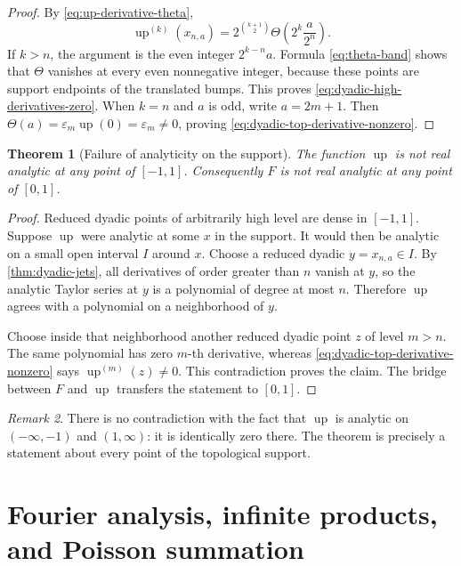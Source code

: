 \documentclass[11pt,oneside]{article}
\newtheorem{theorem}{Theorem}[section]
\theoremstyle{definition}
\theoremstyle{remark}
\newtheorem{remark}[theorem]{Remark}
\newcommand{\upf}{\operatorname{up}}
\newcommand{\epsTM}{\varepsilon}
\newcommand{\Thetaf}{\Theta}
\begin{document}
\begin{proof}
By \eqref{eq:up-derivative-theta},
\[
 \upf^{(k)}(x_{n,a})
 =2^{\binom{k+1}{2}}\Thetaf\left(2^k\frac{a}{2^n}\right).
\]
If $k>n$, the argument is the even integer $2^{k-n}a$.  Formula
\eqref{eq:theta-band} shows that $\Thetaf$ vanishes at every even nonnegative
integer, because these points are support endpoints of the translated bumps.
This proves \eqref{eq:dyadic-high-derivatives-zero}.  When $k=n$ and $a$ is odd,
write $a=2m+1$.  Then
$\Thetaf(a)=\epsTM_m\upf(0)=\epsTM_m\ne0$, proving
\eqref{eq:dyadic-top-derivative-nonzero}.
\end{proof}

\begin{theorem}[Failure of analyticity on the support]\label{thm:nowhere-analytic}
The function $\upf$ is not real analytic at any point of $[-1,1]$.  Consequently
$F$ is not real analytic at any point of $[0,1]$.
\end{theorem}

\begin{proof}
Reduced dyadic points of arbitrarily high level are dense in $[-1,1]$.  Suppose
$\upf$ were analytic at some $x$ in the support.  It would then be analytic on a
small open interval $I$ around $x$.  Choose a reduced dyadic $y=x_{n,a}\in I$.
By \cref{thm:dyadic-jets}, all derivatives of order greater than $n$ vanish at $y$,
so the analytic Taylor series at $y$ is a polynomial of degree at most $n$.
Therefore $\upf$ agrees with a polynomial on a neighborhood of $y$.

Choose inside that neighborhood another reduced dyadic point $z$ of level $m>n$.
The same polynomial has zero $m$-th derivative, whereas
\eqref{eq:dyadic-top-derivative-nonzero} says $\upf^{(m)}(z)\ne0$.  This
contradiction proves the claim.  The bridge between $F$ and $\upf$ transfers the
statement to $[0,1]$.
\end{proof}

\begin{remark}
There is no contradiction with the fact that $\upf$ is analytic on
$(-\infty,-1)$ and $(1,\infty)$: it is identically zero there.  The theorem is
precisely a statement about every point of the topological support.
\end{remark}

\section{Fourier analysis, infinite products, and Poisson summation}\label{sec:fourier}
\end{document}

